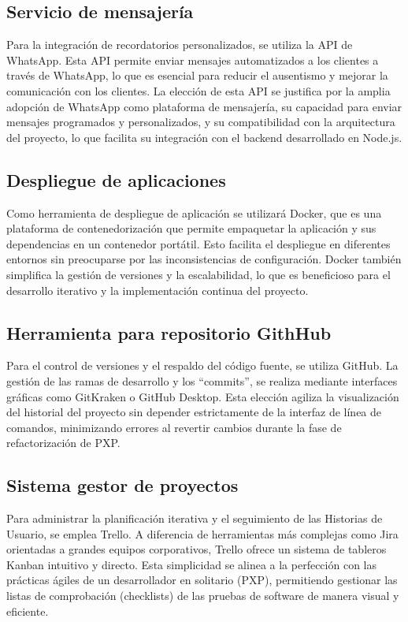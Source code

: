 \subsection{Servicio de mensajería}

Para la integración de recordatorios personalizados, se utiliza la API de WhatsApp. Esta API permite enviar mensajes automatizados a los clientes a través de WhatsApp, lo que es esencial para reducir el ausentismo y mejorar la comunicación con los clientes. La elección de esta API se justifica por la amplia adopción de WhatsApp como plataforma de mensajería, su capacidad para enviar mensajes programados y personalizados, y su compatibilidad con la arquitectura del proyecto, lo que facilita su integración con el backend desarrollado en Node.js.

\subsection{Despliegue de aplicaciones}

Como herramienta de despliegue de aplicación se utilizará Docker\cite{docker}, que es una plataforma de contenedorización que permite empaquetar la aplicación y sus dependencias en un contenedor portátil. Esto facilita el despliegue en diferentes entornos sin preocuparse por las inconsistencias de configuración. Docker también simplifica la gestión de versiones y la escalabilidad, lo que es beneficioso para el desarrollo iterativo y la implementación continua del proyecto.

\subsection{Herramienta para repositorio GithHub}

Para el control de versiones y el respaldo del código fuente, se utiliza GitHub\cite{github}. La gestión de las ramas de desarrollo y los ``commits'', se realiza mediante interfaces gráficas como GitKraken\cite{gitkraken} o GitHub Desktop\cite{githubdesktop}. Esta elección agiliza la visualización del historial del proyecto sin depender estrictamente de la interfaz de línea de comandos, minimizando errores al revertir cambios durante la fase de refactorización de PXP.

\subsection{Sistema gestor de proyectos }

Para administrar la planificación iterativa y el seguimiento de las Historias de Usuario, se emplea Trello\cite{trello}. A diferencia de herramientas más complejas como Jira\cite{jira} orientadas a grandes equipos corporativos, Trello ofrece un sistema de tableros Kanban\cite{anderson2010} intuitivo y directo. Esta simplicidad se alinea a la perfección con las prácticas ágiles de un desarrollador en solitario (PXP), permitiendo gestionar las listas de comprobación (checklists) de las pruebas de software de manera visual y eficiente.

